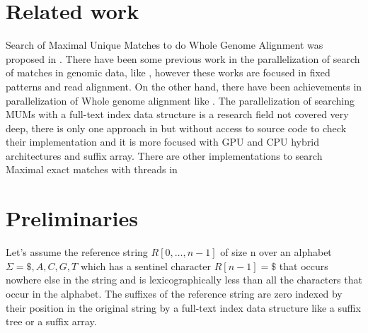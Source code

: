 \documentclass{acm_proc_article-sp}
\begin{document}
\section{Related work}
Search of Maximal Unique Matches to do Whole Genome Alignment was proposed in \cite{Delcher1999}. There have been some previous work in the parallelization of search of matches in genomic data, like \cite{OguzhanKulekci2011,Mongelli,Kouzinopoulos2005}, however these works are focused in fixed patterns and read alignment. On the other hand, there have been achievements in parallelization of Whole genome alignment like \cite{Meng2005}. The parallelization of searching MUMs with a full-text index data structure is a research field not covered very deep, there is only one approach in \cite{Encarnac2011} but without access to source code to check their implementation and it is more focused with GPU and CPU hybrid architectures and suffix array. There are other implementations to search Maximal exact matches with threads in \cite{Vyverman2013,OguzhanKulekci2011,Khan2009,OhlebuschGK10}

\section{Preliminaries}
Let's assume the reference string $R[0,\ldots, n − 1]$ of size n over an alphabet $\Sigma={ \$, A, C, G, T}$ which has a sentinel character $R[n − 1] = \$$ that occurs nowhere else in the string and is lexicographically less than all the characters that occur in the alphabet. The suffixes of the reference string are zero indexed by their position in the original string by a full-text index data structure like a suffix tree or a suffix array. 
\end{document}
